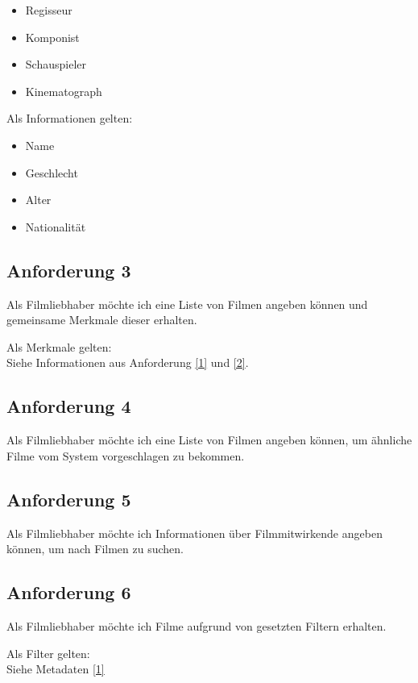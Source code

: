 \documentclass[conference]{IEEEtran}
\begin{document}
\begin{itemize}
        \item Regisseur
        \item Komponist
        \item Schauspieler
        \item Kinematograph
\end{itemize}

Als Informationen gelten:

\begin{itemize}
        \item Name
        \item Geschlecht
        \item Alter
        \item Nationalität
\end{itemize}

\subsection{Anforderung 3}

Als Filmliebhaber möchte ich eine Liste von Filmen angeben können
und gemeinsame Merkmale dieser erhalten.

Als Merkmale gelten:
\\
Siehe Informationen aus Anforderung \ref{1} und \ref{2}.

\subsection{Anforderung 4}

Als Filmliebhaber möchte ich eine Liste von Filmen angeben können,
um ähnliche Filme vom System vorgeschlagen zu bekommen.


\subsection{Anforderung 5}
Als Filmliebhaber möchte ich Informationen über Filmmitwirkende angeben können,
um nach Filmen zu suchen.

\subsection{Anforderung 6}

Als Filmliebhaber möchte ich Filme aufgrund von gesetzten Filtern erhalten.

Als Filter gelten:
\\
Siehe Metadaten \ref{1}
\end{document}
